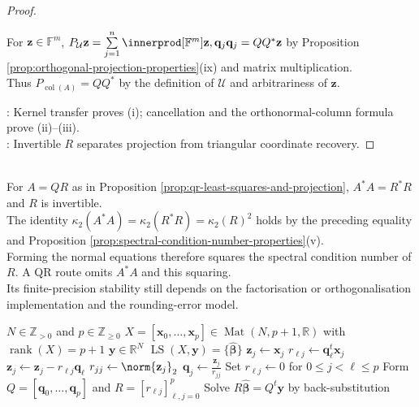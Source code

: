 \begin{proposition}
\begin{proof}
\begin{enumerate}[label=(\roman*)]
For $\mathbf{z}\in\mathbb{F}^m$, $P_{\mathcal{U}}\mathbf{z}=\sum\limits_{j=1}^{n}\innerprod[\mathbb{F}^m]{\mathbf{z},\mathbf{q}_j}\mathbf{q}_j=QQ^*\mathbf{z}$ by Proposition \ref{prop:orthogonal-projection-properties}(ix) and matrix multiplication.\\
Thus $P_{\operatorname{col}(A)}=QQ^*$ by the definition of $\mathcal{U}$ and arbitrariness of $\mathbf{z}$.
\end{enumerate}
: Kernel transfer proves (i); cancellation and the orthonormal-column formula prove (ii)--(iii).\\
: Invertible $R$ separates projection from triangular coordinate recovery.
\end{proof}
\end{proposition}

\begin{perspective} \label{per:normal-equations-squaring-condition-number} \\
For $A=QR$ as in Proposition \ref{prop:qr-least-squares-and-projection}, $A^*A=R^*R$ and $R$ is invertible.\\
The identity $\kappa_2(A^*A)=\kappa_2(R^*R)=\kappa_2(R)^2$ holds by the preceding equality and Proposition \ref{prop:spectral-condition-number-properties}(v).\\
Forming the normal equations therefore squares the spectral condition number of $R$. A QR route omits $A^*A$ and this squaring.\\
Its finite-precision stability still depends on the factorisation or orthogonalisation implementation and the rounding-error model.
\end{perspective}

\begin{breakablealgorithm}
\caption{Classical Gram--Schmidt Least Squares in Exact Arithmetic}
\label{alg:sl-successive-orthogonalization-least-squares}
\begin{algorithmic}
\Require $N\in\mathbb{Z}_{>0}$ and $p\in\mathbb{Z}_{\geq0}$
\Require $X=[\mathbf{x}_0,\ldots,\mathbf{x}_p]\in\operatorname{Mat}(N,p+1,\mathbb{R})$ with $\operatorname{rank}(X)=p+1$
\Require $\mathbf{y}\in\mathbb{R}^N$
\Ensure $\operatorname{LS}(X,\mathbf{y})=\{\widehat{\boldsymbol{\beta}}\}$
\State $\mathbf{z}_j\gets\mathbf{x}_j$
\State $r_{\ell j}\gets\mathbf{q}_\ell^t\mathbf{x}_j$
\State $\mathbf{z}_j\gets\mathbf{z}_j-r_{\ell j}\mathbf{q}_\ell$
\EndFor
\State $r_{jj}\gets\norm{\mathbf{z}_j}_2$
\State $\mathbf{q}_j\gets\frac{\mathbf{z}_j}{r_{jj}}$
\EndFor
\State Set $r_{\ell j}\gets0$ for $0\leq j<\ell\leq p$
\State Form $Q=[\mathbf{q}_0,\ldots,\mathbf{q}_p]$ and $R=[r_{\ell j}]_{\ell,j=0}^{p}$
\State Solve $R\widehat{\boldsymbol{\beta}}=Q^t\mathbf{y}$ by back-substitution
\end{algorithmic}
\end{breakablealgorithm}

